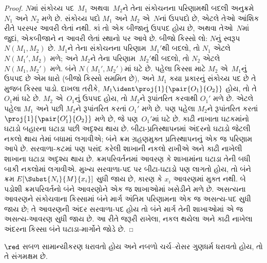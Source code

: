 \documentclass[../../../include/open-logic-section]{subfiles}
\begin{document}
\begin{proof}
  $N$માં સંકોચ્ય પદ~$M_1$ અથવા~$M_2$ને
  તેના સંકોચનના પરિણામથી બદલી અનુક્રમે
  $N_1$ અને $N_2$ મળે છે. સંકોચ્ય પદો
  $M_1$ અને $M_2$ એ~$N$નાં ઉપપદો છે,
  એટલે તેઓ આંશિક રીતે પરસ્પર આવરી લેતાં નથી.
  કાં તો એક બીજાનું ઉપપદ હોય છે, અથવા
  તેઓ~$N$માં જુદાં, એકબીજાને ન આવરી લેતાં
  સ્થાનો પર આવે છે. બીજો કિસ્સો લો:
  $N$નું સ્વરૂપ $N(M_1,M_2)$ છે.
  $M_1$ને તેના સંકોચનના પરિણામ~$M_1'$થી
  બદલો, તો $N_1$ એટલે $N(M_1',M_2)$
  મળે; અને $M_2$ને તેના પરિણામ~$M_2'$થી
  બદલો, તો $N_2$ એટલે $N(M_1,M_2')$
  મળે. બંને $N(M_1',M_2')$માં ઘટે છે.
  પહેલા કિસ્સા માટે $M_2$ એ~$M_1$નું
  ઉપપદ છે એમ ધારો (બીજો કિસ્સો સમમિત છે),
  અને $M_1$ કયા પ્રકારનું સંકોચ્ય પદ છે
  તે મુજબ કિસ્સા પાડો. દાખલા તરીકે,
  $M_1 \ident \proj{1}{\pair{O_1}{O_2}}$
  હોય, તો તે $O_1$માં ઘટે છે. $M_2$
  એ~$O_1$નું ઉપપદ હોય, તો $M_2$ને
  રૂપાંતરિત કરવાથી $O_1'$ મળે છે.
  એટલે પહેલા $M_1$ અને પછી $M_2$ને
  રૂપાંતરિત કરતાં $O_1'$ મળે છે.
  પણ પહેલા $M_2$ને રૂપાંતરિત કરતાં
  $\proj{1}{\pair{O_1'}{O_2}}$ મળે છે,
  જે પણ~$O_1'$માં ઘટે છે.
  કાઢી નાખાતા ઘટકમાંનો ઘટાડો બહારના ઘટાડા પછી
  અદૃશ્ય થાય છે. બીટા-પ્રતિસ્થાપનમાં અંદરનો ઘટાડો
  જેટલી નકલો થાય તેમાં બધામાં લગાવીએ; બંને ક્રમ
  ગ્રહણમુક્ત પ્રતિસ્થાપનનું એક જ પરિણામ આપે છે.
  સરવાળા-કટમાં પણ પસંદ કરેલી શાખાની નકલો રાખીએ
  અને કાઢી નાખેલી શાખાના ઘટાડા અદૃશ્ય થાય છે.
  ક્રમપરિવર્તનમાં આવરણ કે શાખામાંના ઘટાડા તેની
  બધી બાકી નકલોમાં લગાવીએ. મુખ્ય સરવાળા-પદ પર
  બીટા-ઘટાડો પણ લાગતો હોય, તો બંને ક્રમ
  $E[\Subst{N_i}{M}{x_i}]$ સુધી જાય છે, કારણ કે
  $x_i$ આવરણમાં મુક્ત નથી. બે પડોશી ક્રમપરિવર્તનો
  બંને આવરણોને એક જ શાખાઓમાં ખસેડીને મળે છે.
  અસત્યના આવરણને સંકોચવાના કિસ્સામાં બંને માર્ગ
  અંતિમ પરિણામના એક જ અસત્ય-પદ સુધી જાય છે;
  તે આવરણની અંદર સરવાળા-પદ હોય તો બંને માર્ગ
  તેની શાખાઓમાં એ જ અસત્ય-આવરણ સુધી જાય છે.
  આ રીતે જરૂરી રાખેલા, નકલ થયેલા અને કાઢી નાખેલા
  અંદરના કિસ્સા બંને ઘટાડા-માર્ગોને જોડે છે.
  
\end{proof}

\begin{lem}
$\red$ સબળ સામાન્યીકરણ ધરાવતો હોય અને નબળો
ચર્ચ--રોસર ગુણધર્મ ધરાવતો હોય, તો તે સંગમક્ષમ છે.
\end{lem}
\end{document}

